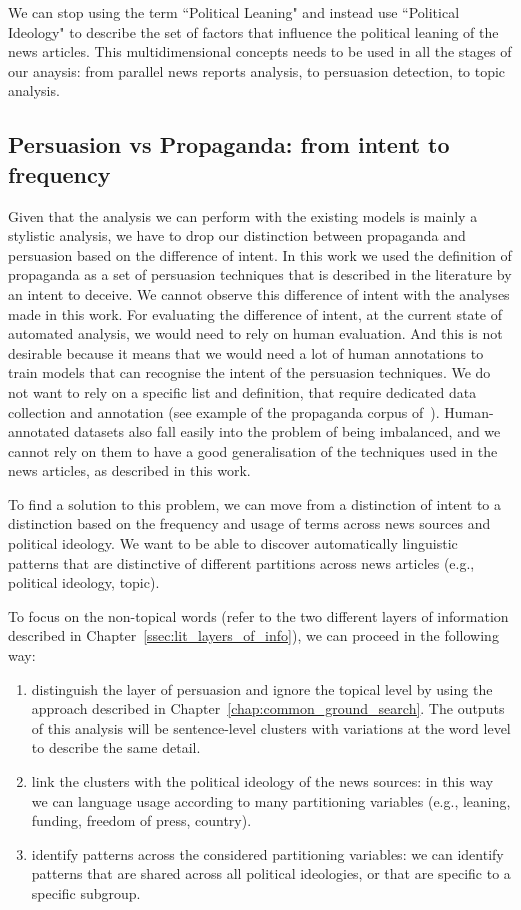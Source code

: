 We can stop using the term ``Political Leaning" and instead use ``Political Ideology" to describe the set of factors that influence the political leaning of the news articles.
This multidimensional concepts needs to be used in all the stages of our anaysis: from parallel news reports analysis, to persuasion detection, to topic analysis.

\subsection{Persuasion vs Propaganda: from intent to frequency}
Given that the analysis we can perform with the existing models is mainly a stylistic analysis, we have to drop our distinction between propaganda and persuasion based on the difference of intent.
In this work we used the definition of propaganda as a set of persuasion techniques that is described in the literature by an intent to deceive.
We cannot observe this difference of intent with the analyses made in this work.
For evaluating the difference of intent, at the current state of automated analysis, we would need to rely on human evaluation.
And this is not desirable because it means that we would need a lot of human annotations to train models that can recognise the intent of the persuasion techniques.
We do not want to rely on a specific list and definition, that require dedicated data collection and annotation (see example of the propaganda corpus of~\citet{da2019fine}).
Human-annotated datasets also fall easily into the problem of being imbalanced, and we cannot rely on them to have a good generalisation of the techniques used in the news articles, as described in this work.

To find a solution to this problem, we can move from a distinction of intent to a distinction based on the frequency and usage of terms across news sources and political ideology.
We want to be able to discover automatically linguistic patterns that are distinctive of different partitions across news articles (e.g., political ideology, topic).

To focus on the non-topical words (refer to the two different layers of information described in Chapter~\ref{ssec:lit_layers_of_info}), we can proceed in the following way:

\begin{enumerate}
    \item distinguish the layer of persuasion and ignore the topical level by using the approach described in Chapter~\ref{chap:common_ground_search}. The outputs of this analysis will be sentence-level clusters with variations at the word level to describe the same detail.
    \item link the clusters with the political ideology of the news sources: in this way we can language usage according to many partitioning variables (e.g., leaning, funding, freedom of press, country).
    \item identify patterns across the considered partitioning variables: we can identify patterns that are shared across all political ideologies, or that are specific to a specific subgroup.
\end{enumerate}


